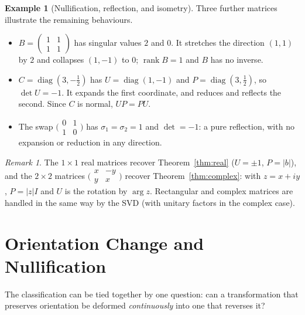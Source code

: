 \documentclass[12pt]{article}
\theoremstyle{definition}
\newtheorem{example}[theorem]{Example}
\theoremstyle{remark}
\newtheorem{remark}[theorem]{Remark}
\newcommand{\rank}{\operatorname{rank}}
\begin{document}
\begin{example}[Nullification, reflection, and isometry]\label{ex:others}
Three further matrices illustrate the remaining behaviours.
\begin{itemize}
\item $B=\begin{pmatrix}1&1\\1&1\end{pmatrix}$ has singular values $2$ and $0$. It stretches the direction $(1,1)$ by $2$ and collapses $(1,-1)$ to $0$; $\rank B=1$ and $B$ has no inverse.
\item $C=\operatorname{diag}(3,-\tfrac12)$ has $U=\operatorname{diag}(1,-1)$ and $P=\operatorname{diag}(3,\tfrac12)$, so $\det U=-1$. It expands the first coordinate, and reduces and reflects the second. Since $C$ is normal, $UP=PU$.
\item The swap $\bigl(\begin{smallmatrix}0&1\\1&0\end{smallmatrix}\bigr)$ has $\sigma_1=\sigma_2=1$ and $\det=-1$: a pure reflection, with no expansion or reduction in any direction.
\end{itemize}
\end{example}

\begin{remark}
The $1\times1$ real matrices recover Theorem~\ref{thm:real} ($U=\pm1$, $P=|b|$), and the $2\times2$ matrices $\bigl(\begin{smallmatrix}x&-y\\y&x\end{smallmatrix}\bigr)$ recover Theorem~\ref{thm:complex}: with $z=x+iy$, $P=|z|I$ and $U$ is the rotation by $\arg z$. Rectangular and complex matrices are handled in the same way by the SVD (with unitary factors in the complex case).
\end{remark}

\section{Orientation Change and Nullification}\label{sec:orientation}
The classification can be tied together by one question: can a transformation that preserves orientation be deformed \emph{continuously} into one that reverses it?
\end{document}
